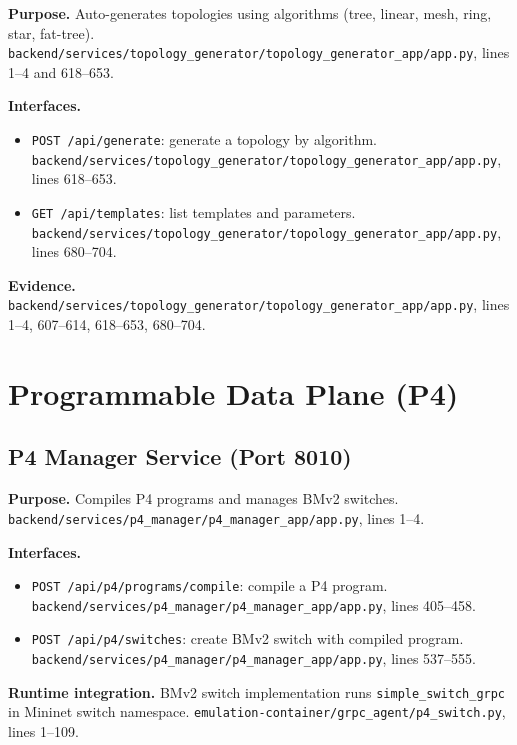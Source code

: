 \documentclass[10pt,a4paper]{article}
\begin{document}
\textbf{Purpose.} Auto-generates topologies using algorithms (tree, linear, mesh, ring, star, fat-tree). \texttt{backend/services/topology\_generator/topology\_generator\_app/app.py}, lines 1--4 and 618--653.

\textbf{Interfaces.}
\begin{itemize}[leftmargin=*]
\item \texttt{POST /api/generate}: generate a topology by algorithm. \texttt{backend/services/topology\_generator/topology\_generator\_app/app.py}, lines 618--653.
\item \texttt{GET /api/templates}: list templates and parameters. \texttt{backend/services/topology\_generator/topology\_generator\_app/app.py}, lines 680--704.
\end{itemize}

\textbf{Evidence.} \texttt{backend/services/topology\_generator/topology\_generator\_app/app.py}, lines 1--4, 607--614, 618--653, 680--704.

\section{Programmable Data Plane (P4)}

\subsection{P4 Manager Service (Port 8010)}

\textbf{Purpose.} Compiles P4 programs and manages BMv2 switches. \texttt{backend/services/p4\_manager/p4\_manager\_app/app.py}, lines 1--4.

\textbf{Interfaces.}
\begin{itemize}[leftmargin=*]
\item \texttt{POST /api/p4/programs/compile}: compile a P4 program. \texttt{backend/services/p4\_manager/p4\_manager\_app/app.py}, lines 405--458.
\item \texttt{POST /api/p4/switches}: create BMv2 switch with compiled program. \texttt{backend/services/p4\_manager/p4\_manager\_app/app.py}, lines 537--555.
\end{itemize}

\textbf{Runtime integration.} BMv2 switch implementation runs \texttt{simple\_switch\_grpc} in Mininet switch namespace. \texttt{emulation-container/grpc\_agent/p4\_switch.py}, lines 1--109.
\end{document}
